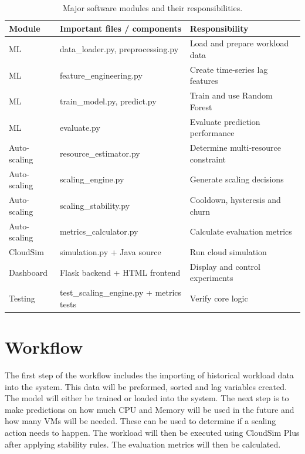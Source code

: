 \documentclass[10pt,journal,compsoc]{IEEEtran}
\begin{document}
\begin{table}[htbp]
\caption{Major software modules and their responsibilities.}
\centering
\begin{tabular}{|p{1.5cm}|p{3.2cm}|p{2.9cm}|}
\hline
\textbf{Module} & \textbf{Important files / components} & \textbf{Responsibility} \\ \hline
ML & data\_loader.py, preprocessing.py & Load and prepare workload data \\ \hline
ML & feature\_engineering.py & Create time-series lag features \\ \hline
ML & train\_model.py, predict.py & Train and use Random Forest \\ \hline
ML & evaluate.py & Evaluate prediction performance \\ \hline
Auto-scaling & resource\_estimator.py & Determine multi-resource constraint \\ \hline
Auto-scaling & scaling\_engine.py & Generate scaling decisions \\ \hline
Auto-scaling & scaling\_stability.py & Cooldown, hysteresis and churn \\ \hline
Auto-scaling & metrics\_calculator.py & Calculate evaluation metrics \\ \hline
CloudSim & simulation.py + Java source & Run cloud simulation \\ \hline
Dashboard & Flask backend + HTML frontend & Display and control experiments \\ \hline
Testing & test\_scaling\_engine.py + metrics tests & Verify core logic \\ \hline
\end{tabular}
\label{tab:modules}
\end{table}

\section{Workflow}
The first step of the workflow includes the importing of historical workload data into the system. This data will be preformed, sorted and lag variables created. The model will either be trained or loaded into the system. The next step is to make predictions on how much CPU and Memory will be used in the future and how many VMs will be needed. These can be used to determine if a scaling action needs to happen. The workload will then be executed using CloudSim Plus after applying stability rules. The evaluation metrics will then be calculated.
\end{document}
